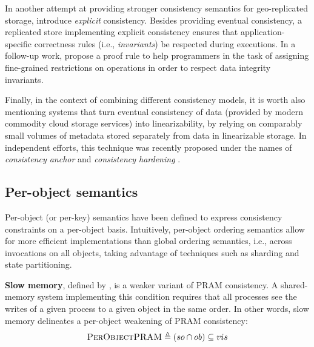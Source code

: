 \documentclass[letter, 11pt]{article}
\newcommand{\citeN}{\citet}
\renewcommand{\cite}{\citep}
\begin{document}
In another attempt at providing stronger consistency semantics for geo-replicated storage, \citeN{Balegas.Duarte.ea:15} introduce \emph{explicit} consistency.
Besides providing eventual consistency, a replicated store implementing explicit consistency ensures that 
application-specific correctness rules (i.e., \emph{invariants}) be respected during executions.
In a follow-up work, \citeN{Gotsman.ea:16} propose a proof rule to help programmers
in the task of assigning fine-grained restrictions on operations in order to respect data integrity invariants. 

Finally, in the context of combining different consistency models, it is worth also mentioning systems that turn eventual consistency of data (provided by modern commodity cloud storage services) into linearizability, by relying on comparably small volumes of metadata stored separately from data in linearizable storage. In independent efforts, this technique was recently proposed under the names of \emph{consistency anchor} \cite{Bessani.Mendes.ea:14} and \emph{consistency hardening} \cite{Dobre.ea:14}.


\subsection{Per-object semantics}
\label{subsec:perobject}
Per-object (or per-key) semantics have been defined to express consistency constraints on a per-object basis. Intuitively, per-object ordering semantics allow for more efficient implementations than global ordering semantics, i.e., across invocations on all objects, taking advantage of techniques such as sharding and state partitioning. 

\textbf{Slow memory}, defined by \citeN{Hutto.Ahamad:90}, is a weaker variant of PRAM consistency.
A shared-memory system implementing this condition requires
that all processes see the writes of a given process to a given object in the same order. In other words, slow memory delineates a per-object weakening of PRAM consistency:
\begin{align}
\textsc{PerObjectPRAM} \triangleq (so \cap ob) \subseteq vis 
\end{align}
\end{document}
